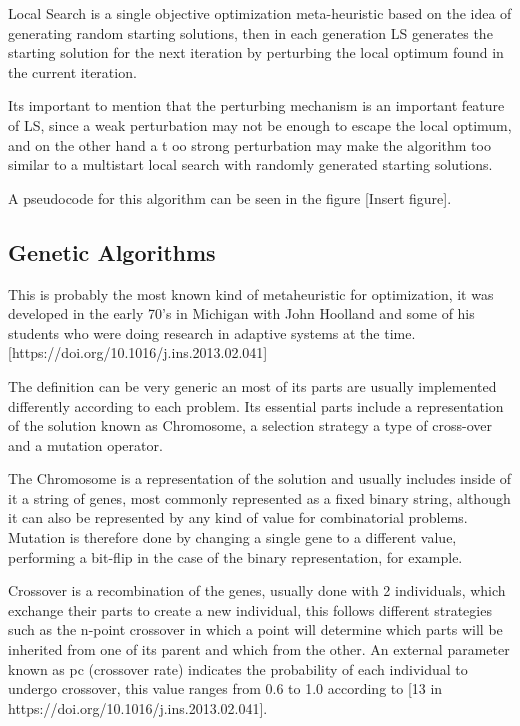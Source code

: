 Local Search is a single objective optimization meta-heuristic based on the idea of generating random starting solutions, then in each generation LS generates the starting solution for the next iteration by perturbing the local optimum found in the current iteration.  

Its important to mention that the perturbing mechanism is an important feature of LS, since a weak perturbation may not be enough to escape the local optimum, and on the other hand a t oo strong perturbation may make the algorithm too similar to a multistart local search with randomly generated starting solutions.

A pseudocode for this algorithm can be seen in the figure [Insert figure].

\subsection{Genetic Algorithms}

This is probably the most known kind of metaheuristic for optimization, it was developed in the early 70's in Michigan with John Hoolland and some of his students who were doing research in adaptive systems at the time. [https://doi.org/10.1016/j.ins.2013.02.041]

The definition can be very generic an most of its parts are usually implemented differently according to each problem. Its essential parts include a representation of the solution known as Chromosome, a selection strategy a type of cross-over and a mutation operator.

The Chromosome is a representation of the solution and usually includes inside of it a string of genes, most commonly represented as a fixed binary string, although it can also be represented by any kind of value for combinatorial problems. Mutation is therefore done by changing a single gene to a different value, performing a bit-flip in the case of the binary representation, for example.

Crossover is a recombination of the genes, usually done with 2 individuals, which exchange their parts to create a new individual, this follows different strategies such as the n-point crossover in which a point will determine which parts will be inherited from one of its parent and which from the other. An external parameter known as pc (crossover rate) indicates the probability of each individual to undergo crossover, this value ranges from 0.6 to 1.0 according to [13 in https://doi.org/10.1016/j.ins.2013.02.041]. 

